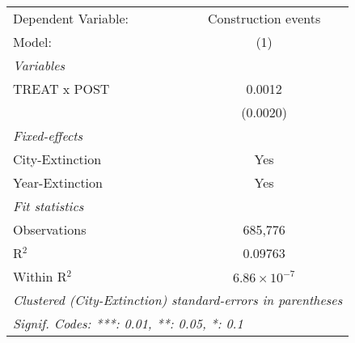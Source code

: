 \begingroup
\centering
\begin{tabular}{lc}
   \tabularnewline \midrule \midrule
   Dependent Variable: & Construction events\\  
   Model:              & (1)\\  
   \midrule
   \emph{Variables}\\
   TREAT x POST        & 0.0012\\   
                       & (0.0020)\\   
   \midrule
   \emph{Fixed-effects}\\
   City-Extinction     & Yes\\  
   Year-Extinction     & Yes\\  
   \midrule
   \emph{Fit statistics}\\
   Observations        & 685,776\\  
   R$^2$               & 0.09763\\  
   Within R$^2$        & $6.86\times 10^{-7}$\\   
   \midrule \midrule
   \multicolumn{2}{l}{\emph{Clustered (City-Extinction) standard-errors in parentheses}}\\
   \multicolumn{2}{l}{\emph{Signif. Codes: ***: 0.01, **: 0.05, *: 0.1}}\\
\end{tabular}
\par\endgroup
